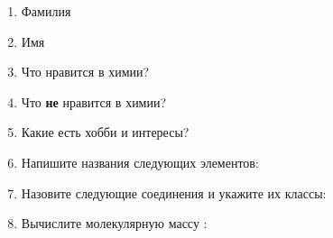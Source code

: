 \documentclass[12pt, a4paper, oneside]{article}	%
\begin{document}
\begin{enumerate}[1.] %
	\item
		Фамилия

		\hrulefill

	\item
		Имя

		\hrulefill

	\item
		Что нравится в химии?

		\hrulefill

		\hrulefill

	\item
		Что \textbf{не} нравится в химии?

		\hrulefill

		\hrulefill

	\item
		Какие есть хобби и интересы?

		\hrulefill

		\hrulefill

	\item
		Напишите названия следующих элементов:


		\hrulefill

		\hrulefill

	\item
		Назовите следующие соединения и укажите их классы:


		\hrulefill

		\hrulefill
	
		\hrulefill
	
	\item
		Вычислите молекулярную массу :

		\hrulefill

		\hrulefill

\end{enumerate}
\end{document}
